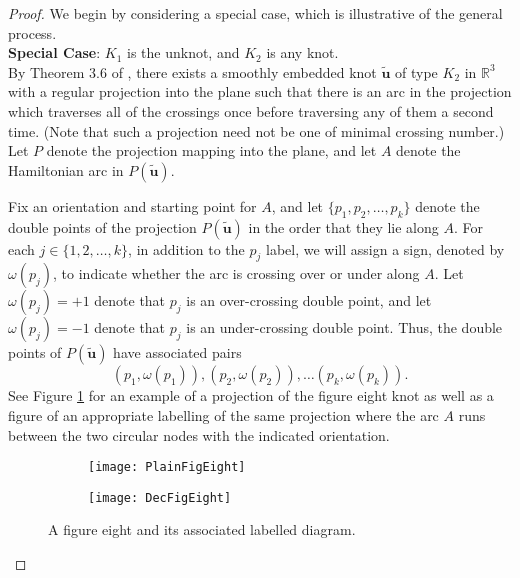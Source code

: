 \documentclass[12pt]{article}
\numberwithin{equation}{subsection}
\theoremstyle{definition}
\numberwithin{lem}{section}
\begin{document}
\begin{proof}
We begin by considering a special case, which is illustrative of the general process.\\

\noindent \textbf{Special Case}: $K_1$ is the unknot, and $K_2$ is any knot.\\

By Theorem 3.6 of \cite{DE04}, there exists a smoothly embedded knot $\tilde{\mathbf{u}}$ of type $K_2$ in $\mathbb{R}^3$ with a regular projection into the plane such that there is an arc in the projection which traverses all of the crossings once before traversing any of them a second time.  (Note that such a projection need not be one of minimal crossing number.)  Let $P$ denote the projection mapping into the plane, and let $A$ denote the Hamiltonian arc in $P(\tilde{\mathbf{u}})$.

Fix an orientation and starting point for $A$, and let $\{p_1, p_2, \ldots, p_k\}$ denote the double points of the projection $P(\tilde{\mathbf{u}})$ in the order that they lie along $A$.  For each $j \in \{1,2, \ldots, k\}$, in addition to the $p_j$ label, we will assign a sign, denoted by $\omega(p_j)$, to indicate whether the arc is crossing over or under along $A$.  Let $\omega(p_j) = +1$ denote that $p_j$ is an over-crossing double point, and let $\omega(p_j) = -1$ denote that $p_j$ is an under-crossing double point.  Thus, the double points of $P(\tilde{\mathbf{u}})$ have associated pairs 
$$(p_1, \omega(p_1)), (p_2, \omega(p_2)), \ldots (p_k, \omega(p_k)).$$
See Figure \ref{fig:labelfigeight} for an example of a projection of the figure eight knot as well as a figure of an appropriate labelling of the same projection where the arc $A$ runs between the two circular nodes with the indicated orientation.

\begin{figure}[h]
\begin{center}
   \begin{subfigure}[b]{0.48\textwidth}
                \centering
		\texttt{[image: PlainFigEight]}
    \end{subfigure} 
   \begin{subfigure}[b]{0.48\textwidth}
                \centering
		\texttt{[image: DecFigEight]}
    \end{subfigure}\end{center}
\caption{A figure eight and its associated labelled diagram.}
\label{fig:labelfigeight}
\end{figure}


\end{proof}
\end{document}
